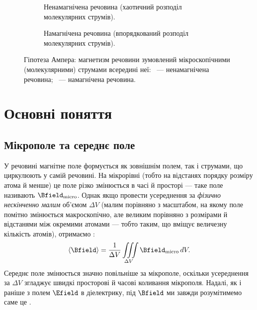 \begin{figure}[h!]\centering
\begin{subfigure}[t]{0.45\linewidth}\centering
    \caption{Ненамагнічена речовина (хаотичний розподіл молекулярних струмів).}
    \label{pic:unmagnetized}
\end{subfigure}
\hfill %
\begin{subfigure}[t]{0.45\linewidth}\centering
    \caption{Намагнічена речовина (впорядкований розподіл молекулярних струмів).}
    \label{pic:magnetized}
\end{subfigure}
\caption{Гіпотеза Ампера: магнетизм речовини зумовлений мікроскопічними
    (молекулярними) струмами всередині неї:
    \protect{}~--- ненамагнічена речовина;
    \protect{}~--- намагнічена речовина.}
\label{pic:AmpereHypotesis}
\end{figure}


\section{Основні поняття}\hypertarget{magnetics-basic-concepts}{}


\subsection*{Мікрополе та середнє поле}


У речовині магнітне поле формується як зовнішнім полем, так і струмами, що циркулюють у самій речовині. На мікрорівні (тобто на відстанях порядку
розміру атома й менше) це поле різко змінюється в часі й просторі --- таке поле називають  $\Bfield_\text{micro}$. Однак якщо
провести усереднення за \emph{фізично нескінченно малим} об'ємом $\Delta V$ (малим порівняно з масштабом, на якому поле помітно змінюється
макроскопічно, але великим порівняно з розмірами й відстанями між окремими атомами --- тобто таким, що вміщує величезну кількість атомів), отримаємо
:
\begin{equation*}
		\langle\Bfield\rangle = \frac1{\Delta V}\iiint\limits_{\Delta V} \Bfield_\text{micro}\, dV.
\end{equation*}
Середнє поле змінюється значно повільніше за мікрополе, оскільки усереднення за $\Delta V$ згладжує швидкі просторові й часові коливання мікрополя. Надалі, як і
раніше з полем $\Efield$ в діелектрику, під $\Bfield$ ми завжди розумітимемо саме це .

